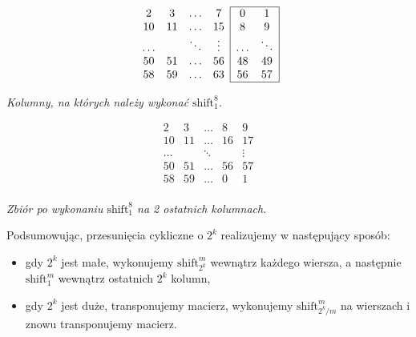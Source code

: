 \documentclass[a4paper]{article}
\newcommand{\shift}[2]{\text{shift}_{#2}^{#1}}
\theoremstyle{definition}
\begin{document}
\begin{minipage}{.5\textwidth} %

\[
\begin{array}{c c  c c}
 2  &  3 & \ldots & 7 \\
 10 & 11 & \ldots & 15 \\
\ldots & & \ddots &  \vdots \\
 50 & 51 & \ldots & 56  \\
 58 & 59 & \ldots & 63  \\ 
\end{array}
\begin{array}{| c c |}
\hline
 0 &  1 \\
 8 &  9 \\
\ldots & \ddots \\
 48 & 49 \\
 56 & 57 \\
 \hline
\end{array}
\]

\begin{center} \it
    Kolumny, na których należy wykonać \(\shift 8 1\).
\end{center}
\end{minipage}
\begin{minipage}{.5\textwidth} %

\[
\begin{matrix}
 2  &  3 & \ldots & 8  &  9  \\
 10 & 11 & \ldots & 16 & 17\\
\ldots & & \ddots &  & \vdots \\
 50 & 51 & \ldots & 56 & 57 \\
 58 & 59 & \ldots & 0 &  1 \\ 
\end{matrix}
\]

\begin{center} \it
    Zbiór po wykonaniu \(\shift 8 1\) na 2 ostatnich kolumnach.
\end{center}
\end{minipage}

\vspace{1em}

Podsumowując, przesunięcia cykliczne o \(2^k\) realizujemy w następujący sposób:

\begin{itemize}
    \item gdy \(2^k\) jest małe, wykonujemy \(\shift{m}{2^k}\) wewnątrz każdego wiersza, a następnie \(\shift{m}{1}\) wewnątrz ostatnich \(2^k\) kolumn,
    \item gdy \(2^k\) jest duże, transponujemy macierz, wykonujemy \(\shift {m} {2^k/m} \) na wierszach i znowu transponujemy macierz.
\end{itemize}
\end{document}
